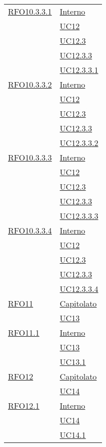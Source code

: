 \begin{longtable}{|>{\centering}m{5cm}|m{5cm}<{\centering}|}
 \hyperlink{RFO10.3.3.1}{RFO10.3.3.1} 
& \hyperlink{Interno}{Interno}\\
& \hyperref[UC12]{UC12}\\
& \hyperref[UC12.3]{UC12.3}\\
& \hyperref[UC12.3.3]{UC12.3.3}\\
& \hyperref[UC12.3.3.1]{UC12.3.3.1}\\\hline

 \hyperlink{RFO10.3.3.2}{RFO10.3.3.2} 
& \hyperlink{Interno}{Interno}\\
& \hyperref[UC12]{UC12}\\
& \hyperref[UC12.3]{UC12.3}\\
& \hyperref[UC12.3.3]{UC12.3.3}\\
& \hyperref[UC12.3.3.2]{UC12.3.3.2}\\\hline

 \hyperlink{RFO10.3.3.3}{RFO10.3.3.3} 
& \hyperlink{Interno}{Interno}\\
& \hyperref[UC12]{UC12}\\
& \hyperref[UC12.3]{UC12.3}\\
& \hyperref[UC12.3.3]{UC12.3.3}\\
& \hyperref[UC12.3.3.3]{UC12.3.3.3}\\\hline

 \hyperlink{RFO10.3.3.4}{RFO10.3.3.4} 
& \hyperlink{Interno}{Interno}\\
& \hyperref[UC12]{UC12}\\
& \hyperref[UC12.3]{UC12.3}\\
& \hyperref[UC12.3.3]{UC12.3.3}\\
& \hyperref[UC12.3.3.4]{UC12.3.3.4}\\\hline

 \hyperlink{RFO11}{RFO11} 
  & \hyperlink{Capitolato}{Capitolato}\\
& \hyperref[UC13]{UC13}\\\hline

\hyperlink{RFO11.1}{RFO11.1} 
& \hyperlink{Interno}{Interno}\\
& \hyperref[UC13]{UC13}\\
& \hyperref[UC13.1]{UC13.1}\\\hline

 \hyperlink{RFO12}{RFO12} 
  & \hyperlink{Capitolato}{Capitolato}\\
& \hyperref[UC14]{UC14}\\\hline

 \hyperlink{RFO12.1}{RFO12.1} 
 & \hyperlink{Interno}{Interno}\\
& \hyperref[UC14]{UC14}\\
& \hyperref[UC14.1]{UC14.1}\\\hline


\end{longtable}
